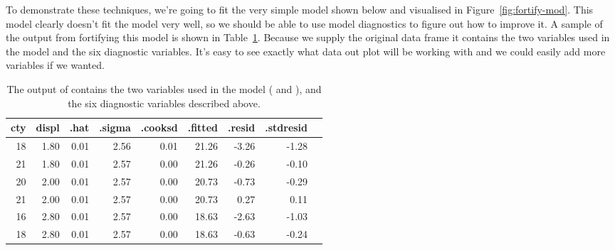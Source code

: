 
To demonstrate these techniques, we're going to fit the very simple model shown below and visualised in Figure~\ref{fig:fortify-mod}.  This model clearly doesn't fit the model very well, so we should be able to use model diagnostics to figure out how to improve it.  A sample of the output from fortifying this model is shown in Table~\ref{tbl:fortify-out}.  Because we supply the original data frame it contains the two variables used in the model and the six diagnostic variables.  It's easy to see exactly what data out plot will be working with and we could easily add more variables if we wanted.

% 



\begin{table}[ht]
  \centering
  \begin{tabular}{rrrrrrrrr}
    \toprule
    cty & displ & .hat & .sigma & .cooksd & .fitted & .resid & .stdresid \\
    \midrule
    18 & 1.80 & 0.01 & 2.56 & 0.01 & 21.26 & -3.26 & -1.28 \\
    21 & 1.80 & 0.01 & 2.57 & 0.00 & 21.26 & -0.26 & -0.10 \\
    20 & 2.00 & 0.01 & 2.57 & 0.00 & 20.73 & -0.73 & -0.29 \\
    21 & 2.00 & 0.01 & 2.57 & 0.00 & 20.73 & 0.27 & 0.11 \\
    16 & 2.80 & 0.01 & 2.57 & 0.00 & 18.63 & -2.63 & -1.03 \\
    18 & 2.80 & 0.01 & 2.57 & 0.00 & 18.63 & -0.63 & -0.24 \\
    \bottomrule
  \end{tabular}
  \caption{The output of  contains the two variables used in the model ( and ), and the six diagnostic variables described above.}
  \label{tbl:fortify-out}
\end{table}


